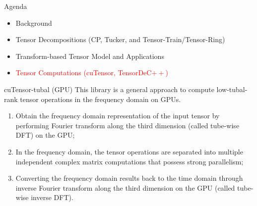\documentclass[t, 10pt, handout, aspectratio=169]{beamer}
\begin{document}
\begin{frame}{Agenda}
\begin{itemize}
    \large \item {Background}
    \large \item {Tensor Decompositions (CP, Tucker, and Tensor-Train/Tensor-Ring)}
    \large \item {Transform-based Tensor Model and Applications}
    \large \item \textcolor{red}{Tensor Computations (cuTensor, TensorDeC$++$)}
\end{itemize}
\end{frame}

\begin{frame}{cuTensor-tubal (GPU)}
\large
This library is a general approach to compute low-tubal-rank tensor operations in the frequency domain on GPUs.
\begin{enumerate}
  \item Obtain the frequency domain representation of the input tensor by performing Fourier transform along the third dimension (called tube-wise DFT) on the GPU;
  \item In the frequency domain, the tensor operations are separated into multiple independent complex matrix computations that possess strong parallelism;
  \item Converting the frequency domain results back to the time domain through inverse Fourier transform along the third dimension on the GPU (called tube-wise inverse DFT).
\end{enumerate}
\end{frame}
\end{document}
